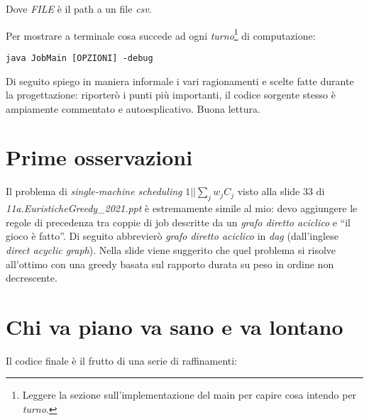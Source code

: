 \documentclass[12pt, letterpaper]{article}
\begin{document}
Dove \textit{FILE} è il path a un file \textit{csv}.
\medskip

\noindent Per mostrare a terminale cosa succede ad ogni \textit{turno}\footnote{Leggere la sezione sull'implementazione del main per capire cosa intendo per \textit{turno}.} di computazione:

\begin{verbatim}
java JobMain [OPZIONI] -debug
\end{verbatim}

Di seguito spiego in maniera informale i vari ragionamenti e scelte fatte durante la progettazione: riporterò i punti più importanti, il codice sorgente stesso è ampiamente commentato e autoesplicativo. Buona lettura.

\section{Prime osservazioni}

Il problema di \textit{single-machine scheduling} $1||\sum_j w_j C_j$ visto alla slide 33 di \textit{11a.EuristicheGreedy\_2021.ppt} è estremamente simile al mio: devo aggiungere le regole di precedenza tra coppie di job descritte da un \textit{grafo diretto aciclico} e ``il gioco è fatto''.
Di seguito abbrevierò \textit{grafo diretto aciclico} in \textit{dag} (dall'inglese \textit{direct acyclic graph}).
Nella slide viene suggerito che quel problema si risolve all'ottimo con una greedy basata sul rapporto durata su peso in ordine non decrescente.

\section{Chi va piano va sano e va lontano}

Il codice finale è il frutto di una serie di raffinamenti:
\end{document}
